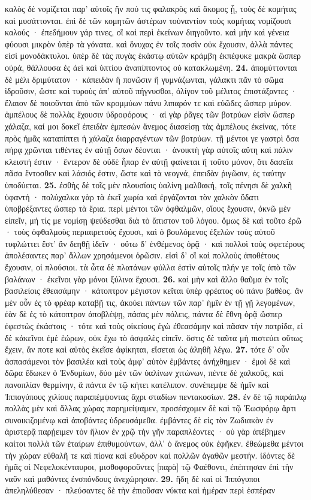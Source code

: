 \documentclass[a4paper, 11pt, oneside, polutonikogreek, german]{article}
\begin{document}
καλὸς δὲ νομίζεται παρ' αὐτοῖς ἤν πού τις φαλακρὸς καὶ ἄκομος ᾖ, τοὺς δὲ κομήτας καὶ μυσάττονται. ἐπὶ δὲ τῶν κομητῶν ἀστέρων τοὐναντίον τοὺς κομήτας νομίζουσι καλούς · ἐπεδήμουν γάρ τινες, οἳ καὶ περὶ ἐκείνων διηγοῦντο. καὶ μὴν καὶ γένεια φύουσι μικρὸν ὑπὲρ τὰ γόνατα. καὶ ὄνυχας ἐν τοῖς ποσὶν οὐκ ἔχουσιν, ἀλλὰ πάντες εἰσὶ μονοδάκτυλοι. ὑπὲρ δὲ τὰς πυγὰς ἑκάστῳ αὐτῶν κράμβη ἐκπέφυκε μακρὰ ὥσπερ οὐρά, θάλλουσα ἐς ἀεὶ καὶ ὑπτίου ἀναπίπτοντος οὐ κατακλωμένη. \textbf{24.} ἀπομύττονται δὲ μέλι δριμύτατον · κἀπειδὰν ἢ πονῶσιν ἢ γυμνάζωνται, γάλακτι πᾶν τὸ σῶμα ἱδροῦσιν, ὥστε καὶ τυροὺς ἀπ' αὐτοῦ πήγνυσθαι, ὀλίγον τοῦ μέλιτος ἐπιστάξαντες · ἔλαιον δὲ ποιοῦνται ἀπὸ τῶν κρομμύων πάνυ λιπαρόν τε καὶ εὐῶδες ὥσπερ μύρον. ἀμπέλους δὲ πολλὰς ἔχουσιν ὑδροφόρους · αἱ γὰρ ῥᾶγες τῶν βοτρύων εἰσὶν ὥσπερ χάλαζα, καί μοι δοκεῖ ἐπειδὰν ἐμπεσὼν ἄνεμος διασείσῃ τὰς ἀμπέλους ἐκείνας, τότε πρὸς ἡμᾶς καταπίπτει ἡ χάλαζα διαρραγέντων τῶν βοτρύων. τῇ μέντοι γε γαστρὶ ὅσα πήρᾳ χρῶνται τιθέντες ἐν αὐτῇ ὅσων δέονται · ἀνοικτὴ γὰρ αὐτοῖς αὕτη καὶ πάλιν κλειστή ἐστιν · ἔντερον δὲ οὐδὲ ἧπαρ ἐν αὐτῇ φαίνεται ἢ τοῦτο μόνον, ὅτι δασεῖα πᾶσα ἔντοσθεν καὶ λάσιός ἐστιν, ὥστε καὶ τὰ νεογνά, ἐπειδὰν ῥιγῶσιν, ἐς ταύτην ὑποδύεται. \textbf{25.} ἐσθὴς δὲ τοῖς μὲν πλουσίοις ὑαλίνη μαλθακή, τοῖς πένησι δὲ χαλκῆ ὑφαντή · πολύχαλκα γὰρ τὰ ἐκεῖ χωρία καὶ ἐργάζονται τὸν χαλκὸν ὕδατι ὑποβρέξαντες ὥσπερ τὰ ἔρια. περὶ μέντοι τῶν ὀφθαλμῶν, οἵους ἔχουσιν, ὀκνῶ μὲν εἰπεῖν, μή τίς με νομίσῃ ψεύδεσθαι διὰ τὸ ἄπιστον τοῦ λόγου. ὅμως δὲ καὶ τοῦτο ἐρῶ · τοὺς ὀφθαλμοὺς περιαιρετοὺς ἔχουσι, καὶ ὁ βουλόμενος ἐξελὼν τοὺς αὐτοῦ τυφλώττει ἔστ' ἂν δεηθῇ ἰδεῖν · οὕτω δ' ἐνθέμενος ὁρᾷ · καὶ πολλοὶ τοὺς σφετέρους ἀπολέσαντες παρ' ἄλλων χρησάμενοι ὁρῶσιν. εἰσὶ δ' οἳ καὶ πολλοὺς ἀποθέτους ἔχουσιν, οἱ πλούσιοι. τὰ ὦτα δὲ πλατάνων φύλλα ἐστὶν αὐτοῖς πλήν γε τοῖς ἀπὸ τῶν βαλάνων · ἐκεῖνοι γὰρ μόνοι ξύλινα ἔχουσι. \textbf{26.} καὶ μὴν καὶ ἄλλο θαῦμα ἐν τοῖς βασιλείοις ἐθεασάμην · κάτοπτρον μέγιστον κεῖται ὑπὲρ φρέατος οὐ πάνυ βαθέος. ἂν μὲν οὖν ἐς τὸ φρέαρ καταβῇ τις, ἀκούει πάντων τῶν παρ' ἡμῖν ἐν τῇ γῇ λεγομένων, ἐὰν δὲ ἐς τὸ κάτοπτρον ἀποβλέψῃ, πάσας μὲν πόλεις, πάντα δὲ ἔθνη ὁρᾷ ὥσπερ ἐφεστὼς ἑκάστοις · τότε καὶ τοὺς οἰκείους ἐγὼ ἐθεασάμην καὶ πᾶσαν τὴν πατρίδα, εἰ δὲ κἀκεῖνοι ἐμὲ ἑώρων, οὐκ ἔχω τὸ ἀσφαλὲς εἰπεῖν. ὅστις δὲ ταῦτα μὴ πιστεύει οὕτως ἔχειν, ἄν ποτε καὶ αὐτὸς ἐκεῖσε ἀφίκηται, εἴσεται ὡς ἀληθῆ λέγω. \textbf{27.} τότε δ' οὖν ἀσπασάμενοι τὸν βασιλέα καὶ τοὺς ἀμφ' αὐτὸν ἐμβάντες ἀνήχθημεν · ἐμοὶ δὲ καὶ δῶρα ἔδωκεν ὁ Ἐνδυμίων, δύο μὲν τῶν ὑαλίνων χιτώνων, πέντε δὲ χαλκοῦς, καὶ πανοπλίαν θερμίνην, ἃ πάντα ἐν τῷ κήτει κατέλιπον. συνέπεμψε δὲ ἡμῖν καὶ Ἱππογύπους χιλίους παραπέμψοντας ἄχρι σταδίων πεντακοσίων. \textbf{28.} ἐν δὲ τῷ παράπλῳ πολλὰς μὲν καὶ ἄλλας χώρας παρημείψαμεν, προσέσχομεν δὲ καὶ τῷ Ἑωσφόρῳ ἄρτι συνοικιζομένῳ καὶ ἀποβάντες ὑδρευσάμεθα. ἐμβάντες δὲ εἰς τὸν Ζωδιακὸν ἐν ἀριστερᾷ παρῄειμεν τὸν ἥλιον ἐν χρῷ τὴν γῆν παραπλέοντες · οὐ γὰρ ἀπέβημεν καίτοι πολλὰ τῶν ἑταίρων ἐπιθυμούντων, ἀλλ' ὁ ἄνεμος οὐκ ἐφῆκεν. ἐθεώμεθα μέντοι τὴν χώραν εὐθαλῆ τε καὶ πίονα καὶ εὔυδρον καὶ πολλῶν ἀγαθῶν μεστήν. ἰδόντες δὲ ἡμᾶς οἱ Νεφελοκένταυροι, μισθοφοροῦντες [παρὰ] τῷ Φαέθοντι, ἐπέπτησαν ἐπὶ τὴν ναῦν καὶ μαθόντες ἐνσπόνδους ἀνεχώρησαν. \textbf{29.} ἤδη δὲ καὶ οἱ Ἱππόγυποι ἀπεληλύθεσαν · πλεύσαντες δὲ τὴν ἐπιοῦσαν νύκτα καὶ ἡμέραν περὶ ἑσπέραν 
\end{document}
